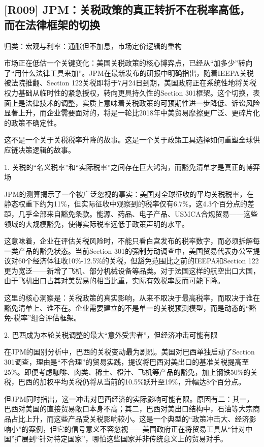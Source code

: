 \documentclass[11pt]{ctexart}
\begin{document}
\subsection{[R009] JPM：关税政策的真正转折不在税率高低，而在法律框架的切换}
{\small\color{refgray}归类：宏观与利率：通胀但不加息，市场定价逻辑的重构}

市场正在低估一个关键变化：美国关税政策的核心博弈点，已经从“加多少”转向了“用什么法律工具来加”。JPM在最新发布的研报中明确指出，随着IEEPA关税被法院推翻、Section 122关税即将于7月24日到期，美国政府正在系统性地将关税权力基础从临时性的紧急授权，转向更具持久性的Section 301框架。这个切换，表面上是法律技术的调整，实质上意味着关税政策的可预期性进一步降低、诉讼风险显著上升，而企业需要面对的，将是一轮比2018年中美贸易摩擦更广泛、更碎片化的政策不确定性。

这不是一个关于关税税率升降的故事。这是一个关于政策工具选择如何重塑全球供应链决策逻辑的故事。

1. 关税的“名义税率”和“实际税率”之间存在巨大鸿沟，而豁免清单才是真正的博弈场

JPM的测算揭示了一个被广泛忽视的事实：美国对全球征收的平均关税税率，在静态权重下约为11\%，但实际征收中观察到的税率仅有6.7\%。这4.3个百分点的差距，几乎全部来自豁免条款。能源、药品、电子产品、USMCA合规贸易——这些领域的大规模豁免，使得实际税率远低于政策声明的水平。

这意味着，企业在评估关税风险时，不能只看白宫发布的税率数字，而必须拆解每一类产品的豁免状态。当前Section 301的强制劳动调查中，美国贸易代表办公室提议对60个经济体征收10\%-12.5\%的关税，但豁免范围比之前的IEEPA和Section 122更为宽泛——新增了飞机、部分机械设备等品类。对于法国这样的航空出口大国，由于飞机出口占其对美贸易的相当比重，实际有效税率反而可能下降。

这里的核心洞察是：关税政策的真实影响，从来不取决于最高税率，而取决于谁在豁免清单上、谁不在。企业需要建立的不是单一的关税预测模型，而是动态的“豁免-税率”组合评估框架。

2. 巴西成为本轮关税调整的最大“意外受害者”，但经济冲击可能有限

在JPM的国别分析中，巴西的关税变动最为剧烈。美国对巴西单独启动了Section 301调查，理由是“不合理”的贸易实践，提议将巴西对美出口的基准关税提高至25\%。即便考虑咖啡、肉类、稀土、橙汁、飞机等产品的豁免，加上钢铁50\%的关税，巴西的加权平均关税仍将从当前的10.5\%跃升至19\%，升幅达8个百分点。

但JPM同时指出，这一冲击对巴西经济的实际影响可能有限。原因有二：其一，巴西对美国的直接贸易敞口本身不高；其二，巴西对美出口结构中，石油等大宗商品占比上升，而这些产品受关税影响较小。这是一个典型的“政策冲击大、经济影响小”的案例，但它的信号意义不容忽视——美国政府正在将贸易工具从“针对中国”扩展到“针对特定国家”，哪怕这些国家并非传统意义上的贸易对手。
\end{document}

